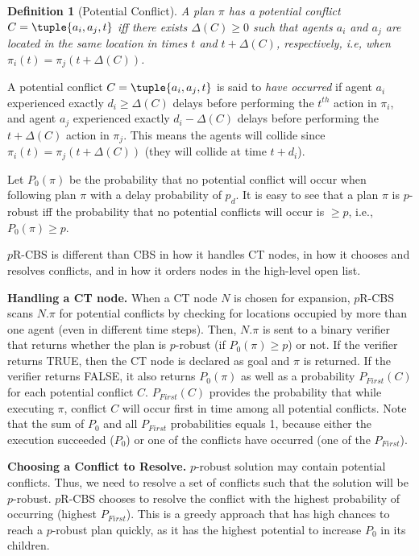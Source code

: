 \documentclass[letterpaper]{article} %
\newcommand{\prcbs}{$p$R-CBS\xspace}
\newtheorem{definition}{Definition}
\begin{document}
\begin{definition}[Potential Conflict]
A plan $\pi$ has a potential conflict $C=\tuple{a_i,a_j,t}$ iff there exists $\Delta(C)\geq 0$ such that agents $a_i$ and $a_j$ are located in the same location in times $t$ and $t+\Delta(C)$, respectively, i.e, when $\pi_i(t) = \pi_j(t+\Delta(C))$.  
\end{definition}

A potential conflict $C=\tuple{a_i,a_j,t}$ 
is said to {\em have occurred} if agent $a_i$ experienced exactly $d_i\geq \Delta(C)$ delays before performing the $t^{th}$ action in $\pi_i$, 
and agent $a_j$ experienced exactly $d_i-\Delta(C)$ delays before performing the $t+\Delta(C)$ action in $\pi_j$. This means the agents will collide  since $\pi_i(t)=\pi_j(t+\Delta(C))$ (they will collide at time $t+d_i$).
 
Let $P_0(\pi)$ be the probability that no potential conflict will occur when following plan $\pi$ with a delay probability of $p_d$. 
It is easy to see that a plan $\pi$ is $p$-robust iff the probability that no potential conflicts will occur is $\geq p$, i.e., $P_0(\pi)\geq p$.


\prcbs{} is different than CBS in how it handles CT nodes, in how it chooses and resolves conflicts, and in how it orders nodes in the high-level open list. 

{\bf Handling a CT node.} When a CT node $N$ is chosen for expansion, \prcbs{} scans $N.\pi$ for potential conflicts by checking for locations occupied by more than one agent (even in different time steps). Then, $N.\pi$ is sent to a binary verifier that returns whether the plan is $p$-robust (if $P_0(\pi) \geq p$) or not. If the verifier returns TRUE, then the CT node is declared as goal and $\pi$ is returned. If the verifier returns FALSE, it also returns $P_0(\pi)$ as well as a probability $P_{First}(C)$ for each potential conflict $C$. $P_{First}(C)$ provides the probability that while executing $\pi$, conflict $C$ will occur first in time among all potential conflicts. Note that the sum of $P_0$ and all $P_{First}$ probabilities equals 1, because either the execution succeeded ($P_0$) or one of the conflicts have occurred (one of the $P_{First}$). 


{\bf Choosing a Conflict to Resolve.} $p$-robust solution may contain potential conflicts. Thus, we need to resolve a set of conflicts such that the solution will be $p$-robust. \prcbs{} chooses to resolve the conflict with the highest probability of occurring (highest $P_{First}$). This is a greedy approach that has high chances to reach a $p$-robust plan quickly, as it has the highest potential to increase $P_0$ in its children. 
\end{document}
